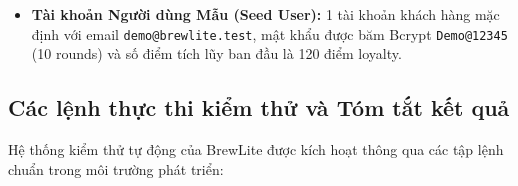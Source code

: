 \documentclass[12pt,a4paper,oneside]{report}
\begin{document}
\begin{itemize}
    \begin{itemize}
        \item \texttt{WELCOME10}: Giảm 10\% tối đa 20.000 VNĐ cho đơn hàng có giá trị tối thiểu từ 40.000 VNĐ.
        \item \texttt{GIAM15K}: Giảm trực tiếp 15.000 VNĐ cho đơn hàng có giá trị tối thiểu từ 60.000 VNĐ.
    \end{itemize}
    \item \textbf{Tài khoản Người dùng Mẫu (Seed User):} 1 tài khoản khách hàng mặc định với email \texttt{demo@brewlite.test}, mật khẩu được băm Bcrypt \texttt{Demo@12345} (10 rounds) và số điểm tích lũy ban đầu là 120 điểm loyalty.
\end{itemize}

\subsection{Các lệnh thực thi kiểm thử và Tóm tắt kết quả}
Hệ thống kiểm thử tự động của BrewLite được kích hoạt thông qua các tập lệnh chuẩn trong môi trường phát triển:
\end{document}
